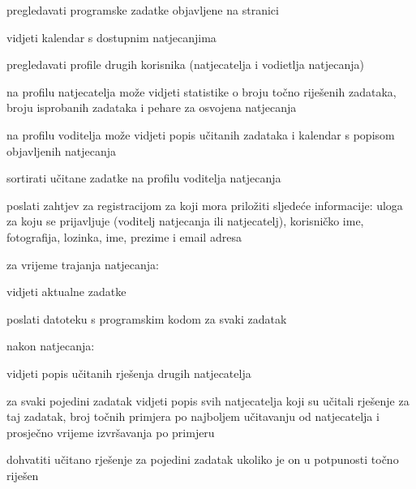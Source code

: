 \begin{packed_enum}
	\item  {}
	
	\begin{packed_enum}
		
		\item pregledavati programske zadatke objavljene na stranici
		\item vidjeti kalendar s dostupnim natjecanjima
		\item pregledavati profile drugih korisnika (natjecatelja i vodietlja natjecanja)
		\begin{packed_enum}
			
			\item  na profilu natjecatelja može vidjeti statistike o broju točno riješenih zadataka, broju isprobanih zadataka i 
			pehare za osvojena natjecanja 
			\item  na profilu voditelja može vidjeti popis učitanih zadataka i kalendar s popisom objavljenih natjecanja
			
		\end{packed_enum}
		\item sortirati učitane zadatke na profilu voditelja natjecanja
		\item poslati zahtjev za registracijom za koji mora priložiti sljedeće informacije: uloga za koju se prijavljuje (voditelj natjecanja ili natjecatelj), korisničko ime,
		fotografija, lozinka, ime, prezime i email adresa
		
	\end{packed_enum}
	
	\item \underbar{Natjecatelj (inicijator) može:}
	\begin{packed_enum}
		
		\item za vrijeme trajanja natjecanja:
		\begin{packed_enum}
			\item vidjeti aktualne zadatke
			\item poslati datoteku s programskim kodom za svaki zadatak
		\end{packed_enum}
		\item nakon natjecanja:
		\begin{packed_enum}
			\item  vidjeti popis učitanih rješenja drugih natjecatelja
			\item za svaki pojedini zadatak vidjeti popis svih natjecatelja koji su učitali rješenje za taj zadatak, broj točnih primjera po najboljem učitavanju od natjecatelja i
			prosječno vrijeme izvršavanja po primjeru 
			\item dohvatiti učitano rješenje za pojedini zadatak ukoliko je on u potpunosti točno riješen
		\end{packed_enum}
		

\end{packed_enum}
\end{packed_enum}
